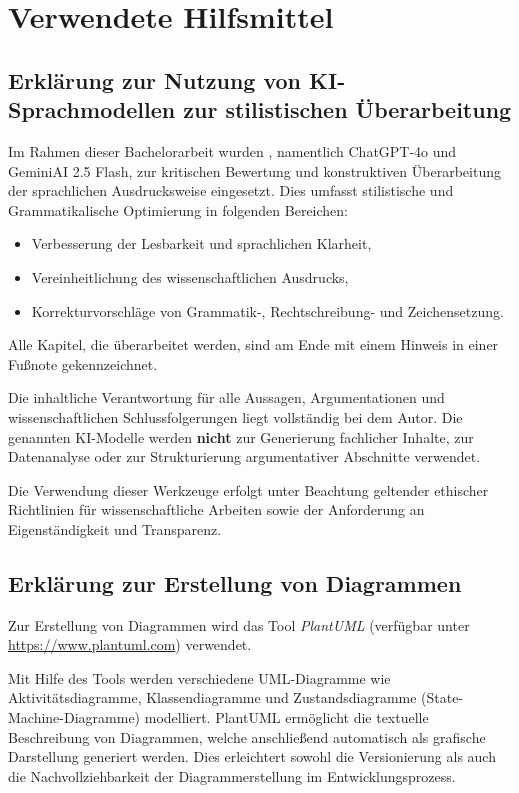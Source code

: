 
\section{Verwendete Hilfsmittel}

\subsection{Erkl\"arung zur Nutzung von KI-Sprachmodellen zur stilistischen \"Uberarbeitung}
Im Rahmen dieser Bachelorarbeit wurden , namentlich ChatGPT-4o und GeminiAI 2.5 Flash, zur kritischen Bewertung und konstruktiven \"Uberarbeitung der sprachlichen Ausdrucksweise eingesetzt. Dies umfasst stilistische und Grammatikalische Optimierung in folgenden Bereichen:

\begin{itemize}
	\item Verbesserung der Lesbarkeit und sprachlichen Klarheit,
	\item Vereinheitlichung des wissenschaftlichen Ausdrucks,
	\item Korrekturvorschl\"age von Grammatik-, Rechtschreibung- und Zeichensetzung.
\end{itemize}

Alle Kapitel, die \"uberarbeitet werden, sind am Ende mit einem Hinweis in einer Fu{\ss}note gekennzeichnet.

Die inhaltliche Verantwortung f\"ur alle Aussagen, Argumentationen und wissenschaftlichen Schlussfolgerungen liegt vollst\"andig bei dem Autor. Die genannten KI-Modelle werden \textbf{nicht} zur Generierung fachlicher Inhalte, zur Datenanalyse oder zur Strukturierung argumentativer Abschnitte verwendet.

Die Verwendung dieser Werkzeuge erfolgt unter Beachtung geltender ethischer Richtlinien f\"ur wissenschaftliche Arbeiten sowie der Anforderung an Eigenst\"andigkeit und Transparenz.

\newpage
\subsection{Erkl\"arung zur Erstellung von Diagrammen}

Zur Erstellung von Diagrammen wird das Tool \textit{PlantUML} (verf\"ugbar unter \url{https://www.plantuml.com}) verwendet. 

Mit Hilfe des Tools werden verschiedene UML-Diagramme wie Aktivit\"atsdiagramme, Klassendiagramme und Zustandsdiagramme (State-Machine-Diagramme) modelliert. PlantUML erm\"oglicht die textuelle Beschreibung von Diagrammen, welche anschlie{\ss}end automatisch als grafische Darstellung generiert werden. Dies erleichtert sowohl die Versionierung als auch die Nachvollziehbarkeit der Diagrammerstellung im Entwicklungsprozess.
